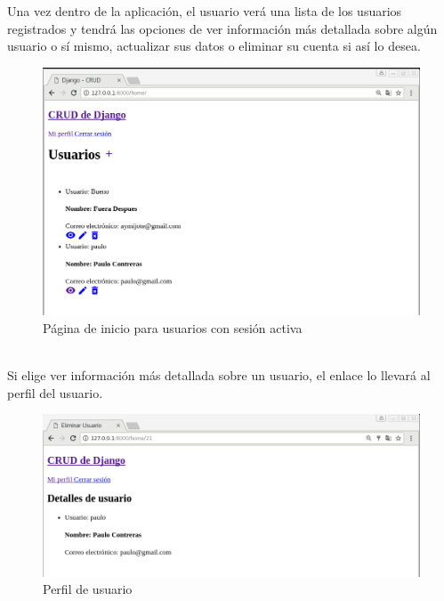 \documentclass[9pt]{article}
\begin{document}
Una vez dentro de la aplicación, el usuario verá una lista de los usuarios registrados y tendrá las opciones de ver información más detallada sobre algún usuario o sí mismo, actualizar sus datos o eliminar su cuenta si así lo desea.\\
\begin{figure}[ht!]
  \centering
  \includegraphics[width=\textwidth]{django_crud/home_logged}
  \caption{Página de inicio para usuarios con sesión activa}
\end{figure}
\\

Si elige ver información más detallada sobre un usuario, el enlace lo llevará al perfil del usuario. \\
\begin{figure}[ht!]
  \centering
  \includegraphics[width=\textwidth]{django_crud/profile}
  \caption{Perfil de usuario}
\end{figure}
\\
\end{document}
